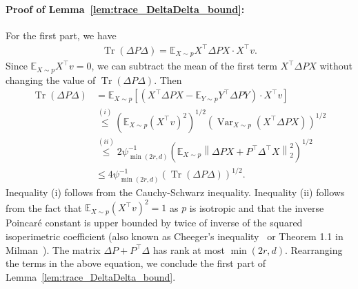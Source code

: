 \documentclass[11pt,twoside]{article}
\newcommand{\isoperi}{\psi}
\theoremstyle{named}
\theoremstyle{plain}
\newcommand{\vecnorm}[2]{\left\| #1\right\|_{#2}}
\newcommand{\Exs}{\ensuremath{{\mathbb{E}}}}
\newcommand{\usedim}{\ensuremath{d}}
\newcommand{\dims}{\usedim}
\DeclareMathOperator{\Var}{Var}
\DeclareMathOperator{\trace}{Tr}
\newcommand{\brackets}[1]{\left[ #1 \right]}
\newcommand{\parenth}[1]{\left( #1 \right)}
\newcommand{\tp}{^\top}
\begin{document}
\paragraph{Proof of Lemma~\ref{lem:trace_DeltaDelta_bound}:} For the first part, we have
\begin{align*}
  \trace\parenth{\Delta P \Delta} = \Exs_{X \sim p} X\tp \Delta P X \cdot X \tp v.
\end{align*}
Since $\Exs_{X\sim p} X\tp v = 0$, we can subtract the mean of the first term $X\tp \Delta P X$ without changing the value of $\trace\parenth{\Delta P \Delta} $. Then
\begin{align*}
  \trace\parenth{\Delta P \Delta} &= \Exs_{X\sim p} \brackets{\parenth{X\tp \Delta P X  - \Exs_{Y \sim p} Y \tp \Delta P Y} \cdot X \tp v} \\
  &\stackrel{(i)}{\leq} \parenth{\Exs_{X\sim p}(X\tp v)^2}^{1/2} \parenth{\Var_{X \sim p }\parenth{X \tp \Delta P X}}^{1/2} \\
  &\stackrel{(ii)}{\leq} 2 \isoperi_{\min(2r, \dims)}^{-1} \parenth{\Exs_{X \sim p} \vecnorm{\Delta P X + P\tp \Delta\tp X}{2}^2}^{1/2} \\
  & \leq 4 \isoperi_{\min(2r, \dims)}^{-1} \parenth{\trace\parenth{\Delta P \Delta}}^{1/2}.
\end{align*}
Inequality (i) follows from the Cauchy-Schwarz inequality. Inequality (ii) follows from the fact that $\Exs_{X\sim p}(X\tp v)^2 = 1$ as $p$ is isotropic and that the inverse Poincar\'e constant is upper bounded by twice of inverse of the squared isoperimetric coefficient (also known as Cheeger's inequality~\cite{maz1960classes,cheeger1969lower} or Theorem 1.1 in Milman~\cite{milman2009role}). The matrix $\Delta P + P\tp \Delta$ has rank at most $\min(2r, \dims)$. Rearranging the terms in the above equation, we conclude the first part of Lemma~\ref{lem:trace_DeltaDelta_bound}.
\end{document}
